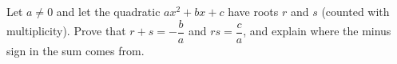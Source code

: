 Let $a\ne0$ and let the quadratic $ax^2+bx+c$ have roots $r$ and $s$ (counted with multiplicity). Prove that $r+s=-\dfrac{b}{a}$ and $rs=\dfrac{c}{a}$, and explain where the minus sign in the sum comes from.
